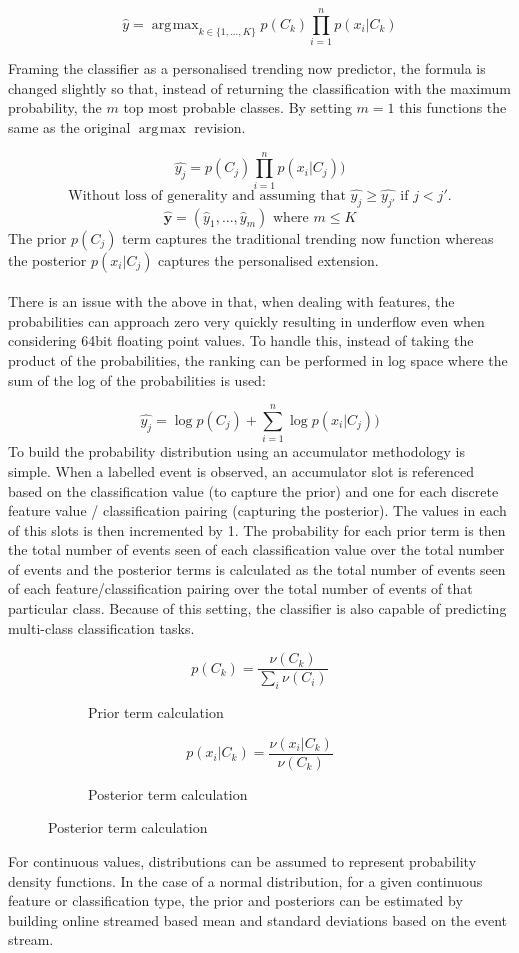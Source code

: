 \documentclass[a4paper,11pt]{scrreprt}
\DeclareMathOperator*{\argmax}{\arg\!\max}
\begin{document}
\[\hat{y}=\argmax_{k \in \{1,...,K\}} p(C_k)\prod_{i=1}^n p(x_i | C_k)\]

Framing the classifier as a personalised trending now predictor, the formula is changed slightly so that, instead of returning the classification with the maximum probability, the \(m\) top most probable classes. By setting \(m=1\) this functions the same as the original \(\argmax\) revision. 

\[\hat{y_j}= p(C_j)\prod_{i=1}^n p(x_i | C_j))\]
\[\text{Without loss of generality and assuming that }  \hat{y_j} \geq \hat{y_{j'}} \text{ if } j < j'.\]
\[\mathbf{\hat{y}} = (\hat{y}_1, ..., \hat{y}_m) \text{ where } m \leq K\]
The prior \(p(C_j)\) term captures the traditional trending now function whereas the posterior \(p(x_i | C_j)\) captures the personalised extension.\\\\ There is an issue with the above in that, when dealing with features, the probabilities can approach zero very quickly resulting in underflow even when considering 64bit floating point values. To handle this, instead of taking the product of the probabilities, the ranking can be performed in log space where the sum of the log of the probabilities is used:

\[\hat{y_j}= \log p(C_j) + \sum_{i=1}^n \log p(x_i | C_j))\]
To build the probability distribution using an accumulator methodology is simple. When a labelled event is observed, an accumulator slot is referenced based on the classification value (to capture the prior) and one for each discrete feature value / classification pairing (capturing the posterior). The values in each of this slots is then incremented by 1. The probability for each prior term is then the total number of events seen of each classification value over the total number of events and the posterior terms is calculated as the total number of events seen of each feature/classification pairing over the total number of events of that particular class. Because of this setting, the classifier is also capable of predicting multi-class classification tasks.

\begin{figure}[h!]
\begin{subfigure}[t]{2 in}
\[p(C_k) = \frac{\nu(C_k)}{\sum_{i} \nu(C_i)}\]
\caption{Prior term calculation}
\end{subfigure}
\begin{subfigure}[t]{2 in}
\[p(x_i | C_k) = \frac{\nu(x_i | C_k)}{\nu(C_k)}\]
\caption{Posterior term calculation}
\end{subfigure}
\end{figure}
For continuous values, distributions can be assumed to represent probability density functions. In the case of a normal distribution, for a given continuous feature or classification type, the prior and posteriors can be estimated by building online streamed based mean and standard deviations based on the event stream. 
\end{document}
